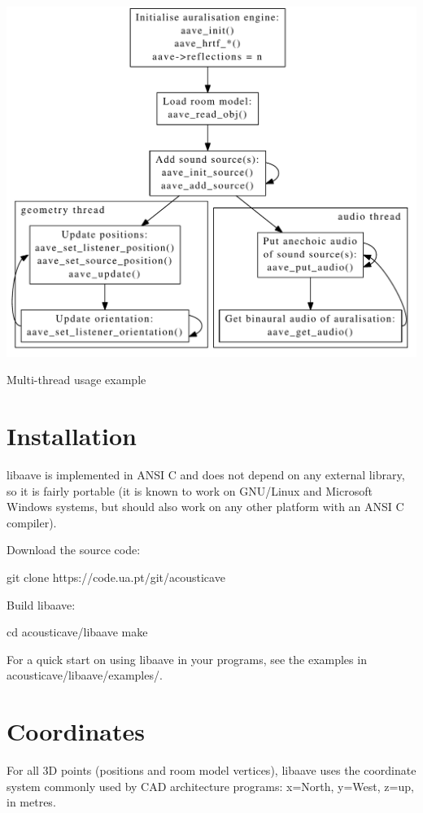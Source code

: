 \begin{DoxyImage}
\includegraphics[width=\textwidth]{usage2}
\caption{Multi-\/thread usage example}
\end{DoxyImage}
\hypertarget{index_installation}{}\section{Installation}\label{index_installation}
libaave is implemented in A\-N\-S\-I C and does not depend on any external library, so it is fairly portable (it is known to work on G\-N\-U/\-Linux and Microsoft Windows systems, but should also work on any other platform with an A\-N\-S\-I C compiler).
\begin{DoxyEnumerate}
\item Download the source code\-: 
\begin{DoxyCode}
git clone https:\textcolor{comment}{//code.ua.pt/git/acousticave}
\end{DoxyCode}

\item Build libaave\-: 
\begin{DoxyCode}
cd acousticave/libaave
make
\end{DoxyCode}

\end{DoxyEnumerate}

For a quick start on using libaave in your programs, see the examples in acousticave/libaave/examples/.\hypertarget{index_coordinates}{}\section{Coordinates}\label{index_coordinates}
For all 3\-D points (positions and room model vertices), libaave uses the coordinate system commonly used by C\-A\-D architecture programs\-: x=North, y=West, z=up, in metres.

